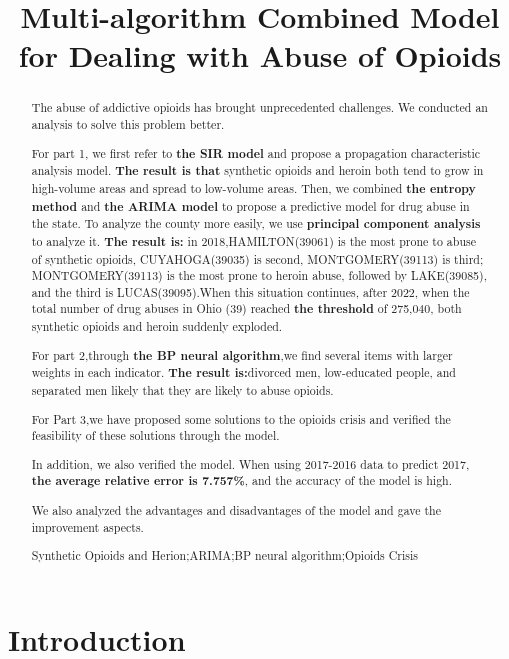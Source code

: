 \documentclass[12pt]{mcmthesis}
\title{Multi-algorithm Combined Model for Dealing with Abuse of Opioids}
\author{}
\date{}
\begin{document}
\begin{abstract}
The abuse of addictive opioids has brought unprecedented challenges. We conducted an analysis to  solve this problem better.\par
For part 1, we first refer to \textbf{the SIR model} and propose a propagation characteristic analysis model. \textbf{The result is that } synthetic opioids and heroin both tend to grow in high-volume areas and spread to low-volume areas. Then, we combined \textbf{the entropy method} and \textbf{the ARIMA model} to propose a predictive model for drug abuse in the state. To analyze the county more easily, we use \textbf{principal component analysis} to analyze it.\textbf{ The result is:} in 2018,HAMILTON(39061) is the most prone to abuse of synthetic opioids, CUYAHOGA(39035) is second, MONTGOMERY(39113) is third; MONTGOMERY(39113) is the most prone to heroin abuse, followed by LAKE(39085), and the third is LUCAS(39095).When this situation continues, after 2022, when the total number of drug abuses in Ohio (39) reached \textbf{the threshold} of 275,040, both synthetic opioids and heroin suddenly exploded.\par
For part 2,through \textbf{the BP neural algorithm},we find several items with larger weights in each indicator. \textbf{The result is:}divorced men, low-educated people, and separated men  likely that they are likely to abuse opioids.\par
For Part 3,we have proposed some solutions to the opioids crisis and verified the feasibility of these solutions through the model.\par
In addition, we also verified the model. When using 2017-2016 data to predict 2017, \textbf{the average relative error is 7.757\%}, and the accuracy of the model is high.\par
We also analyzed the advantages and disadvantages of the model and gave the improvement aspects.
\setlength{\parindent}{0pt}
\begin{keywords}
Synthetic Opioids and Herion;ARIMA;BP neural algorithm;Opioids Crisis
\end{keywords}
\end{abstract}
\maketitle

\tableofcontents
\newpage

\section{Introduction}
\end{document}
